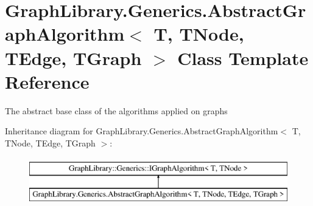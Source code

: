 \hypertarget{class_graph_library_1_1_generics_1_1_abstract_graph_algorithm}{}\section{Graph\+Library.\+Generics.\+Abstract\+Graph\+Algorithm$<$ T, T\+Node, T\+Edge, T\+Graph $>$ Class Template Reference}
\label{class_graph_library_1_1_generics_1_1_abstract_graph_algorithm}


The abstract base class of the algorithms applied on graphs  


Inheritance diagram for Graph\+Library.\+Generics.\+Abstract\+Graph\+Algorithm$<$ T, T\+Node, T\+Edge, T\+Graph $>$\+:\begin{figure}[H]
\begin{center}
\leavevmode
\includegraphics[height=2.000000cm]{class_graph_library_1_1_generics_1_1_abstract_graph_algorithm}
\end{center}
\end{figure}
